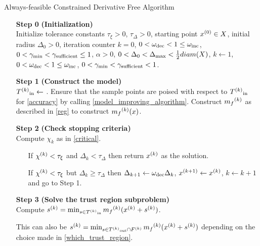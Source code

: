 \begin{algorithm}[H]
    \caption{Always-feasible Constrained Derivative Free Algorithm}
    \label{constrained_dfo}
    \begin{itemize}
        \item[\textbf{Step 0}] \textbf{(Initialization)} \\
            Initialize tolerance constants 
            $\tau_{\xi} > 0$,
            $\tau_{\Delta} > 0$,
            starting point $x^{(0)} \in X$,
            initial radius $\Delta_0 > 0$,
            iteration counter $k=0$,
            $0 < \omega_{\text{dec}} < 1 \le \omega_{\text{inc}}$,
            $0 < \gamma_{\text{min}} < \gamma_{\text{sufficient}} \le 1$,
            $\alpha > 0$,
            $0 < \Delta_0 < \Delta_{\text{max}} < \frac 1 2 diam(X)$,
            $k \gets 1$,
            $0 < \omega_{\text{dec}} < 1 \le \omega_{\text{inc}}$,
            $0 < \gamma_{\text{min}} < \gamma_{\text{sufficient}} < 1$.
            
        \item[\textbf{Step 1}] \textbf{(Construct the model)} \\
            ${T^{(k)}}_{\text{in}}\gets $ .
            Ensure that the sample points are poised with respect to ${T^{(k)}}_{\text{in}}$ for \cref{accuracy} by calling \cref{model_improving_algorithm}.
            Construct ${{m}_f}^{(k)}$ as described in \cref{reg} to construct ${{m}_f}^{(k)}(x)$.
        
        \item[\textbf{Step 2}] \textbf{(Check stopping criteria)} \\
            Compute $\chi_k$ as in \cref{critical}. \begin{itemize}
                \item[] If $ {\chi^{(k)}} < \tau_{\xi} $ and $\Delta_k<\tau_{\Delta}$ then return ${x}^{(k)}$ as the solution.
                \item[] If $ {\chi^{(k)}} < \tau_{\xi} $ but $\Delta_k\ge\tau_{\Delta}$ then 
                $\Delta_{k+1} \gets \omega_{\text{dec}}\Delta_{k}$, 
                $x^{(k+1)} \gets {x}^{(k)}$,
                $k \gets k+1$ and go to Step 1.
            \end{itemize}
        
        \item[\textbf{Step 3}] \textbf{(Solve the trust region subproblem)} \\
            Compute ${s}^{(k)} = \min_{s \in {T^{(k)}}_{\text{in}}} {{m}_f}^{(k)}({x}^{(k)} + {s}^{(k)})$.
            \item[] This can also be ${s}^{(k)} = \min_{s \in {T^{(k)}}_{\text{out}} \cap {F}^{(k)}} {{m}_f}^{(k)}({x}^{(k)} + {s}^{(k)})$ depending on the choice made in \cref{which_trust_region}.
            

\end{itemize}
\end{algorithm}
